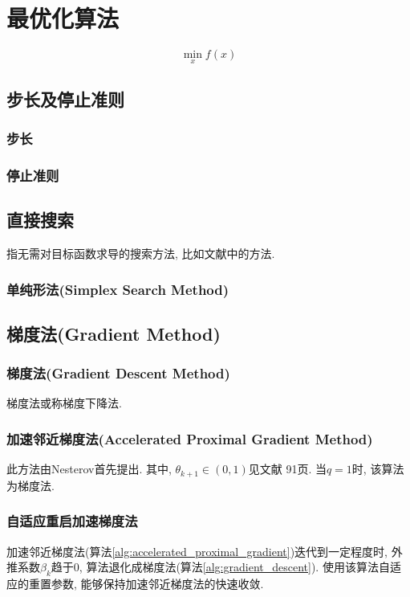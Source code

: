\chapter{最优化算法}

\begin{problem}[无约束极小化]
	\begin{equation}
		\min_x f(x) 
	\end{equation}
\end{problem}

\section{步长及停止准则}
\subsection{步长}


\subsection{停止准则}

\section{直接搜索}
指无需对目标函数求导的搜索方法, 比如文献\cite{schutze2011directed}中的方法.

\subsection{单纯形法(Simplex Search Method)}


\section{梯度法(Gradient Method)}

\subsection{梯度法(Gradient Descent Method)}

梯度法或称梯度下降法.



\subsection{加速邻近梯度法(Accelerated Proximal Gradient Method)}

此方法由Nesterov\cite{nesterov1983method}首先提出. 其中, $\theta_{k+1}\in (0,1)$见文献\cite{nesterov1998introductory} 91页. 当$q=1$时, 该算法为梯度法.



\subsection{自适应重启加速梯度法}

加速邻近梯度法(算法\ref{alg:accelerated_proximal_gradient})迭代到一定程度时, 外推系数$\beta_k$趋于0, 算法退化成梯度法(算法\ref{alg:gradient_descent}). 使用该算法自适应的重置参数, 能够保持加速邻近梯度法的快速收敛.

